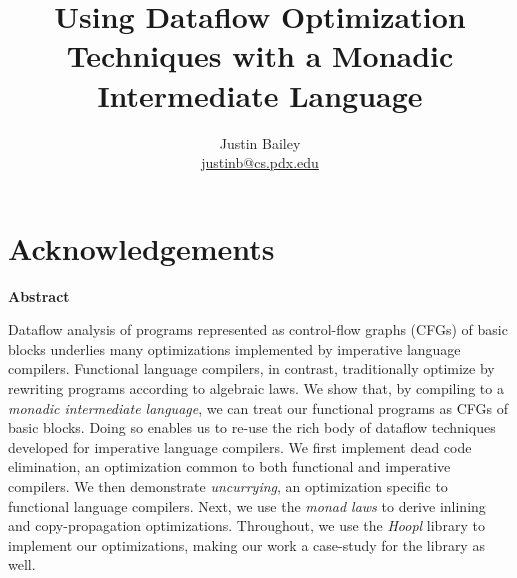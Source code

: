 \dodocclass



\date{}
\author{Justin Bailey \\ \url{justinb@cs.pdx.edu}}
\title{Using Dataflow Optimization Techniques with a Monadic Intermediate Language}
\maketitle 
\thispagestyle{empty}
\newpage
\pagestyle{plain}
\section*{Acknowledgements}
\newpage

\begin{center}
  \newlength{\abstractLen}
  \begin{minipage}{\abstractLen}
    \begin{center}
      {\sffamily\bfseries Abstract}
    \end{center}
    \bigskip
    \noindent
    Dataflow analysis of programs represented as control-flow graphs
    (CFGs) of basic blocks underlies many optimizations implemented by
    imperative language compilers. Functional language compilers, in
    contrast, traditionally optimize by rewriting programs according to
    algebraic laws. We show that, by compiling to a \emph{monadic
      intermediate language}, we can treat our functional programs as
    CFGs of basic blocks. Doing so enables us to re-use the rich body of
    dataflow techniques developed for imperative language compilers. We
    first implement dead code elimination, an optimization common to
    both functional and imperative compilers. We then demonstrate
    \emph{uncurrying}, an optimization specific to functional language
    compilers. Next, we use the \emph{monad laws} to derive inlining and
    copy-propagation optimizations. %
    Throughout, we use the
    \emph{Hoopl} library to implement our optimizations, making our work
    a case-study for the library as well.
  \end{minipage}
\end{center}



